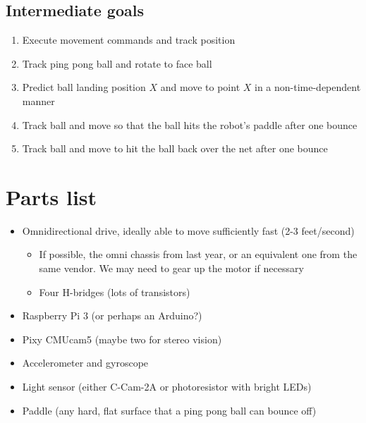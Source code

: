 \documentclass[letterpaper, 11pt]{article}
\begin{document}
\subsection*{Intermediate goals}
\begin{enumerate}
    \item Execute movement commands and track position
    \item Track ping pong ball and rotate to face ball
    \item Predict ball landing position $X$ and move to point $X$ in a non-time-dependent manner
    \item Track ball and move so that the ball hits the robot's paddle after one bounce
    \item Track ball and move to hit the ball back over the net after one bounce
\end{enumerate}

\section{Parts list}
\begin{itemize}
    \item Omnidirectional drive, ideally able to move sufficiently fast (2-3 feet/second)
        \begin{itemize}
            \item If possible, the omni chassis from last year, or an equivalent one from the same vendor. We may need to gear up the motor if necessary
            \item Four H-bridges (lots of transistors)
        \end{itemize}
    \item Raspberry Pi 3 (or perhaps an Arduino?)
    \item Pixy CMUcam5 (maybe two for stereo vision)
    \item Accelerometer and gyroscope
    \item Light sensor (either C-Cam-2A or photoresistor with bright LEDs)
    \item Paddle (any hard, flat surface that a ping pong ball can bounce off)
\end{itemize}
\end{document}
